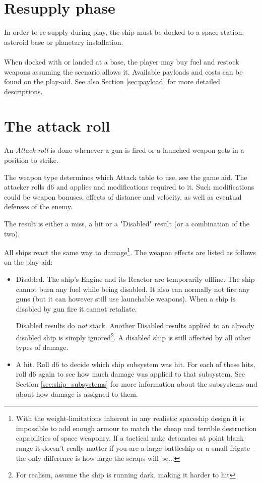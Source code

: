 \documentclass[a4paper,12pt,notitlepage,twocolumn]{article}
\begin{document}
\section{Resupply phase}

In order to re-supply during play, the ship must be docked to a space
station, asteroid base or planetary installation. 
\\\\
When docked with or landed at a base, the player may buy fuel and
restock weapons assuming the scenario allows it. Available payloads and costs
can be found on the play-aid. See also Section \ref{sec:payload} for more
detailed descriptions.

\section{The attack roll}
\label{sec:attack_roll}

An \emph{Attack roll} is done whenever a gun is fired or a 
launched weapon gets in a position to strike.

The weapon type determines which Attack table to use, see the game aid. The
attacker rolls d6 and applies and modifications required to it. Such modifications
could be weapon bonuses, effects of distance and velocity, as well as 
eventual defenses of the enemy. 

The result is either a miss, a hit or a "Disabled" result (or a combination of 
the two). 

All ships react the same way to damage\footnote{With the 
weight-limitations inherent in any realistic spaceship design it is
impossible to add enough armour to match the cheap and terrible destruction
capabilities of space weaponry. If a tactical nuke detonates at point blank
range it doesn't really matter if you are a large battleship or a small frigate
-- the only difference is how large the scraps will be...}. The weapon
effects are listed as follows on the play-aid: 

\begin{itemize}
\item Disabled. The ship's Engine 
  and its Reactor are temporarily offline. The ship cannot burn
  any fuel while being disabled. It also can normally not fire any
  guns (but it can however still use launchable weapons). When a 
  ship is disabled by gun fire it cannot retaliate. 

  Disabled results do \emph{not} stack. Another Disabled results applied
  to an already disabled ship is simply ignored\footnote{For realism, assume
  the ship is running dark, making it harder to hit}. A disabled
  ship is still affected by all other types of damage.
\item A hit. Roll d6 to decide which
  ship subsystem was hit. For each of these hits, roll d6 again to see
  how much damage was applied to that subsystem. See Section
  \ref{sec:ship_subsystems} for more information about the subsystems
  and about how damage is assigned to them. 
\end{itemize}
\end{document}
